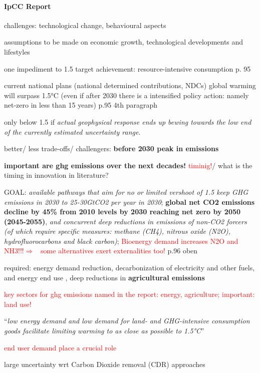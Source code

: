 \documentclass[12pt]{article}
\newcommand{\ar}{$\Rightarrow$ \ }
\newcommand{\tr}[1]{\textcolor{red}{#1}}
\begin{document}
\paragraph{IpCC Report }
\begin{itemize}
\item challenges: technological change, behavioural aspects
\item assumptions to be made on economic growth, technological developments and lifestyles
\item one impediment to 1.5 target achievement: resource-intensive consumption p. 95
\item current national plans (national determined contributions, NDCs) global warming will surpass 1.5°C  (even if after 2030 there is a intensified policy action: namely net-zero in less than 15 years) p.95 4th paragraph
\item only below 1.5 if \textit{actual geophysical response ends up bewing towards the low end of the currently estimated uncertainty range}.
\item better/ less trade-offs/ challengers: \textbf{before 2030 peak in emissions}
\item \textbf{important are ghg emissions over the next decades!} \tr{timinig!}/ what is the timing in innovation in literature?
\item GOAL: \textit{available pathways that aim for no or limited vershoot of 1.5 keep GHG emissions in 2030 to 25-30GtCO2 per year in 2030}; \textbf{global net CO2 emissions decline by 45\% from 2010 levels by 2030 reaching net zero by 2050 (2045-2055)}, \textit{and concurrent deep reductions in emissions of non-CO2 forcers (of which require specific measures: methane (CH4), nitrous oxide (N2O), hydrofluorocarbons and black carbon)}; \tr{Bioenergy demand increases N2O and NH3!!!\ar some alternatives exert externalities too!} p.96 oben 
\item required: energy demand reduction, decarbonization of electricity and other fuels, and energy end use , deep reductions in \textbf{agricultural emissions}
\tr{\item[\ar] key sectors for ghg emissions named in the report: energy, agriculture; important: land use! 
}
\item ``\textit{low energy demand and low demand for land- and GHG-intensive consumption goods facilitate limiting warming to as close as possible to 1.5°C}''
\tr{\item[\ar] end user demand place a crucial role}
\item large uncertainty wrt Carbon Dioxide removal (CDR) approaches

\end{itemize}
\end{document}

